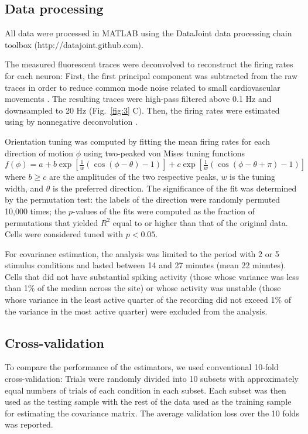 \subsection*{Data processing}
All data were processed in MATLAB using the DataJoint data processing chain toolbox (http://datajoint.github.com).

The measured fluorescent traces were deconvolved to reconstruct the firing rates for each neuron: First, the first principal component was subtracted from the raw traces in order to reduce common mode noise related to small cardiovascular movements \cite{Cotton:2013}. The resulting traces were high-pass filtered above 0.1 Hz and downsampled to 20 Hz (Fig.~\ref{fig:3} C). Then, the firing rates were estimated using by nonnegative deconvolution \cite{Vogelstein:2010}.

Orientation tuning was computed by fitting the mean firing rates for each direction of motion $\phi$ using two-peaked von Mises tuning functions $f(\phi)=a + b\exp\left[\frac 1 w(\cos(\phi-\theta)-1) \right] + c\exp\left[\frac 1 w(\cos(\phi-\theta+\pi)-1) \right]$ where $b\ge c$ are the amplitudes of the two respective peaks, $w$ is the tuning width, and  $\theta$ is the preferred direction. The significance of the fit was determined by the permutation test: the labels of the direction were randomly permuted 10,000 times; the $p$-values of the fits were computed as the fraction of permutations that yielded $R^2$ equal to or higher than that of the original data.  Cells were considered tuned with $p<0.05$.

For covariance estimation, the analysis was limited to the period with 2 or 5 stimulus conditions and lasted between 14 and 27 minutes (mean 22 minutes).  Cells that did not have substantial spiking activity (those whose variance was less than 1\% of the median across the site) or whose activity was unstable (those whose variance in the least active quarter of the recording did not exceed 1\% of the variance in the most active quarter) were excluded from the analysis.

\subsection*{Cross-validation}
To compare the performance of the estimators, we used conventional 10-fold cross-validation: Trials were randomly divided into 10 subsets with approximately equal numbers of trials of each condition in each subset. Each subset was then used as the testing sample with the rest of the data used as the training sample for estimating the covariance matrix. The average validation loss over the 10 folds was reported.


